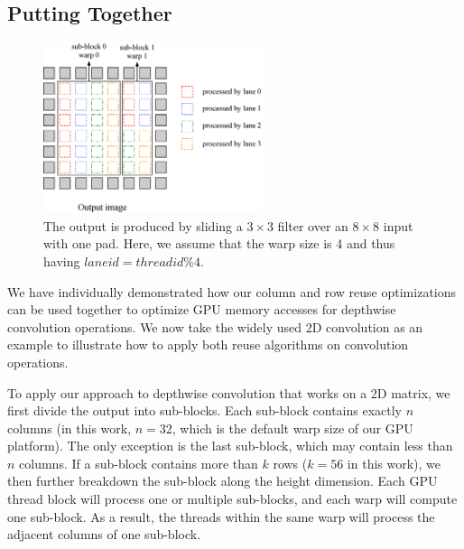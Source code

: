\subsection{Putting Together}
\label{sec:together}
\begin{figure}
	\centering
	\includegraphics[width=0.8\columnwidth,height=5cm]{./figure/overalldesign.eps} \caption{The output is produced by sliding a $3 \times
3$ filter over an $8 \times 8$ input with one pad. Here, we assume
that the warp size is 4 and thus having $laneid=threadid\%4$.} \label{fig:overalldesign}
\vspace{-2mm}
\end{figure}


We have individually demonstrated how our column and row reuse optimizations can be used together to optimize GPU memory accesses for
depthwise convolution operations. We now take the widely used 2D convolution as an example to illustrate how to apply both reuse algorithms
on convolution operations.


To apply our approach to depthwise convolution that works on a 2D matrix, we first divide the output into sub-blocks. Each sub-block
contains exactly $n$ columns (in this work, $n = 32$, which is the default warp size of our GPU platform). The only exception is the last
sub-block, which may contain less than $n$ columns. If a sub-block contains more than $k$ rows ($k=56$ in this work), we then further
breakdown the sub-block along the height dimension. Each GPU thread block will process one or multiple sub-blocks, and each warp will
compute one sub-block. As a result, the threads within the same warp will process the adjacent columns of one sub-block.


